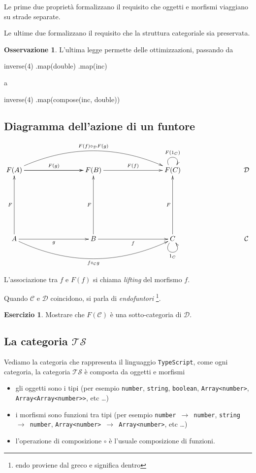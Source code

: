 \documentclass[12pt]{article}
\theoremstyle{definition}
\newtheorem{exercise}{Esercizio}[section]
\newtheorem{observation}{Osservazione}[section]
\newenvironment{code}
  {\vspace{0.5cm} \VerbatimEnvironment\begin{typescriptcode}}
  {\end{typescriptcode} \vspace{0.2cm}}
\begin{document}
Le prime due proprietà formalizzano il requisito che oggetti e morfismi viaggiano su strade separate.

Le ultime due formalizzano il requisito che la struttura categoriale sia preservata.

\begin{observation}
L'ultima legge permette delle ottimizzazioni, passando da

\begin{code}
inverse(4)
  .map(double)
  .map(inc)
\end{code}

a

\begin{code}
inverse(4)
  .map(compose(inc, double))
\end{code}
\end{observation}

\subsection{Diagramma dell'azione di un funtore}

\[
\xymatrixrowsep{3cm}
\xymatrixcolsep{3cm}
\xymatrix{
  F(A) \ar[r]^{F(g)} \ar[r] \ar@/^1cm/[rr]^{F(f) \circ_\mathcal{D} F(g)} & F(B) \ar[r]^{F(f)} & F(C) \ar@(ul,ur)^{F(1_C)} & \mathcal{D} \\
  A \ar[u]^F \ar[r]_g \ar@/_1cm/[rr]_{f \circ_\mathcal{C} g}  & B \ar[u]^F \ar[r]_f & C \ar[u]^F \ar@(dl,dr)_{1_C} & \mathcal{C}
}
\]

L'associazione tra $f$ e $F(f)$ si chiama \emph{lifting} del morfismo $f$.

Quando $\mathcal{C}$ e $\mathcal{D}$ coincidono, si parla di \emph{endofuntori} \footnote{endo proviene dal greco e significa dentro}.

\begin{exercise}
Mostrare che $F(\mathcal{C})$ è una sotto-categoria di $\mathcal{D}$.
\end{exercise}

\subsection{La categoria $\mathcal{TS}$}

Vediamo la categoria che rappresenta il linguaggio \texttt{TypeScript}, come ogni categoria,
la categoria $\mathcal{TS}$ è composta da oggetti e morfismi

\begin{itemize}
  \item gli oggetti sono i tipi (per esempio \texttt{number}, \texttt{string}, \texttt{boolean}, \texttt{Array<number>}, \texttt{Array<Array<number>>}, etc \ldots)
  \item i morfismi sono funzioni tra tipi (per esempio \texttt{number $\rightarrow$ number}, \texttt{string $\rightarrow$ number}, \texttt{Array<number> $\rightarrow$ Array<number>}, etc \ldots)
  \item l'operazione di composizione $\circ$ è l'usuale composizione di funzioni.
\end{itemize}
\end{document}
